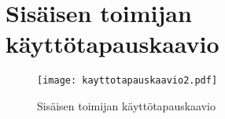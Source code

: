\chapter{Sisäisen toimijan käyttötapauskaavio}
\label{kayttotapaus2}

\begin{figure}
    \texttt{[image: kayttotapauskaavio2.pdf]}
    \caption{Sisäisen toimijan käyttötapauskaavio}
    \label{img:asiakas}
\end{figure}
